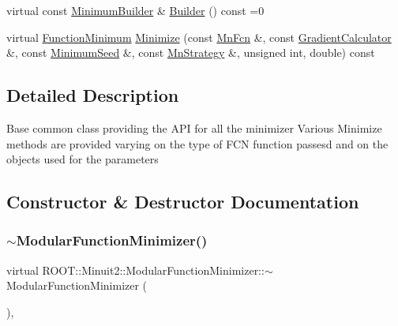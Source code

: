 \begin{DoxyCompactItemize}
\item 
virtual const \mbox{\hyperlink{classROOT_1_1Minuit2_1_1MinimumBuilder}{Minimum\+Builder}} \& \mbox{\hyperlink{classROOT_1_1Minuit2_1_1ModularFunctionMinimizer_a13e98551cf14e927c61e1e34ecf8ba8b}{Builder}} () const =0
\item 
virtual \mbox{\hyperlink{classROOT_1_1Minuit2_1_1FunctionMinimum}{Function\+Minimum}} \mbox{\hyperlink{classROOT_1_1Minuit2_1_1ModularFunctionMinimizer_ad4852ac93fa43f2328b9857acc602296}{Minimize}} (const \mbox{\hyperlink{classROOT_1_1Minuit2_1_1MnFcn}{Mn\+Fcn}} \&, const \mbox{\hyperlink{classROOT_1_1Minuit2_1_1GradientCalculator}{Gradient\+Calculator}} \&, const \mbox{\hyperlink{classROOT_1_1Minuit2_1_1MinimumSeed}{Minimum\+Seed}} \&, const \mbox{\hyperlink{classROOT_1_1Minuit2_1_1MnStrategy}{Mn\+Strategy}} \&, unsigned int, double) const
\end{DoxyCompactItemize}


\subsection{Detailed Description}
Base common class providing the A\+PI for all the minimizer Various Minimize methods are provided varying on the type of F\+CN function passesd and on the objects used for the parameters 

\subsection{Constructor \& Destructor Documentation}
\mbox{\label{classROOT_1_1Minuit2_1_1ModularFunctionMinimizer_ae8442b0de1a033c86c7b5167f66e0eed}} 
\subsubsection{\texorpdfstring{$\sim$ModularFunctionMinimizer()}{~ModularFunctionMinimizer()}\hspace{0.1cm}{\footnotesize\ttfamily [1/3]}}
{\footnotesize\ttfamily virtual R\+O\+O\+T\+::\+Minuit2\+::\+Modular\+Function\+Minimizer\+::$\sim$\+Modular\+Function\+Minimizer (\begin{DoxyParamCaption}{ }\end{DoxyParamCaption})\hspace{0.3cm}{\ttfamily [inline]}, {\ttfamily [virtual]}}

